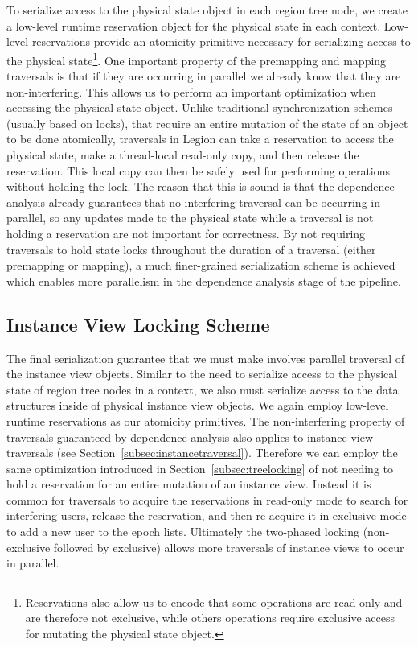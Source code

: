 To serialize access to the physical state object
in each region tree node, we create a low-level
runtime reservation object for the physical state
in each context. Low-level reservations provide
an atomicity primitive necessary for serializing
access to the physical state\footnote{Reservations
also allow us to encode that some operations are
read-only and are therefore not exclusive, while 
others operations require exclusive access for
mutating the physical state object.}. One important
property of the premapping and mapping
traversals is that if they are occurring in parallel
we already know that they are non-interfering.
This allows us to perform an important optimization
when accessing the physical state
object. Unlike traditional synchronization schemes
(usually based on locks), that require an entire
mutation of the state of an object to be done
atomically, traversals in Legion can take a
reservation to access the physical state, make
a thread-local read-only copy, and then release the
reservation. This local copy can then be safely
used for performing operations without holding
the lock. The reason that this is sound is that
the dependence analysis already guarantees that no
interfering traversal can be occurring in parallel,
so any updates made to the physical state while
a traversal is not holding a reservation are 
not important for correctness. By not requiring
traversals to hold state locks throughout the
duration of a traversal (either premapping or
mapping), a much finer-grained serialization
scheme is achieved which enables more parallelism
in the dependence analysis stage of the pipeline.

\subsection{Instance View Locking Scheme}
\label{subsec:viewlocking}
The final serialization guarantee that we must make
involves parallel traversal of the instance view
objects. Similar to the need to serialize access
to the physical state of region tree nodes in a
context, we also must serialize access to the 
data structures inside of physical instance view
objects. We again employ low-level runtime 
reservations as our atomicity primitives. The
non-interfering property of traversals guaranteed
by dependence analysis also applies to instance
view traversals (see 
Section~\ref{subsec:instancetraversal}). Therefore
we can employ the same optimization introduced in
Section~\ref{subsec:treelocking} of not needing
to hold a reservation for an entire mutation of 
an instance view. Instead it is common for traversals 
to acquire the reservations in read-only mode to 
search for interfering users, release the reservation, 
and then re-acquire it in exclusive mode to add a
new user to the epoch lists. 
Ultimately the two-phased locking (non-exclusive
followed by exclusive) allows more traversals
of instance views to occur in parallel.

